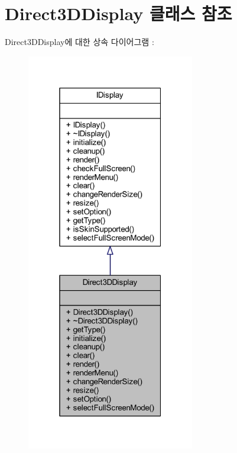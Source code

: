 \hypertarget{class_direct3_d_display}{}\section{Direct3\+D\+Display 클래스 참조}
\label{class_direct3_d_display}


Direct3\+D\+Display에 대한 상속 다이어그램 \+: \nopagebreak
\begin{figure}[H]
\begin{center}
\leavevmode
\includegraphics[width=208pt]{class_direct3_d_display__inherit__graph}
\end{center}
\end{figure}


